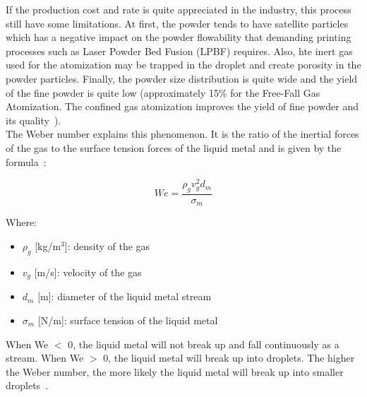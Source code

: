 \documentclass[../main]{subfiles}
\begin{document}

If the production cost and rate is quite appreciated in the industry, this process still have some limitations. At first, the powder tends to have satellite particles which has a negative impact on the powder flowability that demanding printing processes such as Laser Powder Bed Fusion (LPBF) requires. Also, hte inert gas used for the atomization may be trapped in the droplet and create porosity in the powder particles. Finally, the powder size distribution is quite wide and the yield of the fine powder is quite low (approximately 15\% for the Free-Fall Gas Atomization. The confined gas atomization improves the yield of fine powder and its quality~\cite{Jang2020PowderBased, DErricoDESIGNEXPERIMENTAL}).\\

The Weber number explains this phenomenon. It is the ratio of the inertial forces of the gas to the surface tension forces of the liquid metal and is given by the formula~\cite{Chang2022NumericalSimulation}:

\vspace{0mm}
\begin{equation}
    We = \frac{\rho_g v_g^2 d_m}{\sigma_m}
\end{equation}
\vspace{0mm}

\vspace{0mm}
\begin{minipage}{\linewidth}
Where:
    \begin{itemize}
        \item[] $\rho_g$ [kg/m$^{3}$]: density of the gas 
        \item[] $v_g$ [m/s]: velocity of the gas
        \item[] $d_m$ [m]: diameter of the liquid metal stream
        \item[] $\sigma_m$ [N/m]: surface tension of the liquid metal
    \end{itemize}
\end{minipage}
\vspace{2mm}

When We $<$ 0, the liquid metal will not break up and fall continuously as a stream. When We $>$ 0, the liquid metal will break up into droplets. The higher the Weber number, the more likely the liquid metal will break up into smaller droplets~\cite{Du2024NumericalSimulation}.\\
\end{document}
